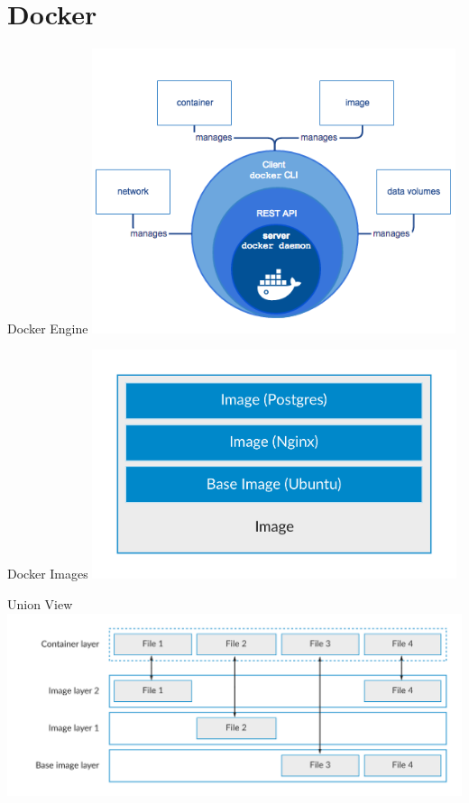 \documentclass[10pt]{beamer}
\begin{document}
\section{Docker}

\begin{frame}{Docker Engine}
  \center
  \includegraphics[width=0.8\textwidth]{../images/8-docker-engine.png}
\end{frame}

\begin{frame}{Docker Images}
  \center
  \includegraphics[width=0.8\textwidth]{../images/9-docker-image.png}
\end{frame}

\begin{frame}{Union View}
  \center
  \includegraphics[width=1\textwidth]{../images/union.png}
\end{frame}
\end{document}
